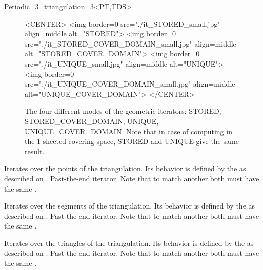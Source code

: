 \begin{ccRefClass}{Periodic_3_triangulation_3<PT,TDS>}
\begin{figure}[htbp]
\begin{ccTexOnly}
\begin{center}
\end{center}
\end{ccTexOnly}
\begin{ccHtmlOnly}
<CENTER>
<img border=0 src="./it_STORED_small.jpg" align=middle
  alt="STORED">
<img border=0 src="./it_STORED_COVER_DOMAIN_small.jpg" align=middle
  alt="STORED_COVER_DOMAIN">
<img border=0 src="./it_UNIQUE_small.jpg" align=middle
  alt="UNIQUE">
<img border=0 src="./it_UNIQUE_COVER_DOMAIN_small.jpg" align=middle
  alt="UNIQUE_COVER_DOMAIN">
</CENTER>
\end{ccHtmlOnly}
\caption{The four different modes of the geometric iterators: STORED,
  STORED\_COVER\_DOMAIN, UNIQUE, UNIQUE\_COVER\_DOMAIN. Note that in
  case of computing in the 1-sheeted covering space, STORED and UNIQUE give the
  same result.
\label{P3Triangulation3-fig-geom_iterators}}
\end{figure} 



{Iterates over the points of the triangulation. Its behavior is
  defined by the   as described on
  .}
\ccGlue
{}
{Past-the-end iterator. Note that to match another
   both must have the same
   .}

{Iterates over the segments of the triangulation. Its behavior is
  defined by the   as described on
  .}
\ccGlue
{}
{Past-the-end iterator. Note that to match another
   both must have the same
   .}

{Iterates over the triangles of the triangulation. Its behavior is
  defined by the   as described on
  .}
\ccGlue
{}
{Past-the-end iterator. Note that to match another
   both must have the same
   .}


\end{ccRefClass}

